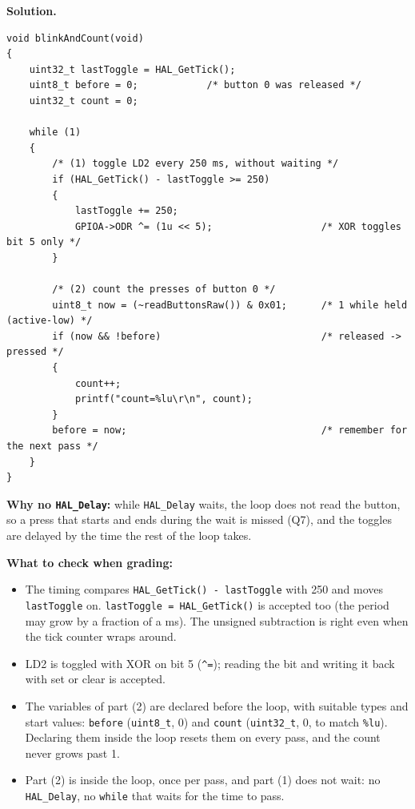 \documentclass[11pt,a4paper]{article}
\newenvironment{solution}{\par\noindent\ignorespaces}{\par}
\begin{document}
\begin{solution}
\medskip\noindent\textbf{Solution.}
\begin{lstlisting}
void blinkAndCount(void)
{
    uint32_t lastToggle = HAL_GetTick();
    uint8_t before = 0;            /* button 0 was released */
    uint32_t count = 0;

    while (1)
    {
        /* (1) toggle LD2 every 250 ms, without waiting */
        if (HAL_GetTick() - lastToggle >= 250)
        {
            lastToggle += 250;
            GPIOA->ODR ^= (1u << 5);                   /* XOR toggles bit 5 only */
        }

        /* (2) count the presses of button 0 */
        uint8_t now = (~readButtonsRaw()) & 0x01;      /* 1 while held (active-low) */
        if (now && !before)                            /* released -> pressed */
        {
            count++;
            printf("count=%lu\r\n", count);
        }
        before = now;                                  /* remember for the next pass */
    }
}
\end{lstlisting}
\textbf{Why no \texttt{HAL\_Delay}:} while \texttt{HAL\_Delay} waits, the loop does not read the button, so a press
that starts and ends during the wait is missed (Q7), and the toggles are delayed by the time the rest of the loop takes.

\medskip\noindent\textbf{What to check when grading:}
\begin{itemize}
  \item The timing compares \texttt{HAL\_GetTick() - lastToggle} with 250 and moves \texttt{lastToggle} on.
        \texttt{lastToggle = HAL\_GetTick()} is accepted too (the period may grow by a fraction of a ms). The unsigned
        subtraction is right even when the tick counter wraps around.
  \item LD2 is toggled with XOR on bit 5 (\texttt{\^{}=}); reading the bit and writing it back with set or clear is
        accepted.
  \item The variables of part (2) are declared before the loop, with suitable types and start values:
        \texttt{before} (\texttt{uint8\_t}, 0) and \texttt{count} (\texttt{uint32\_t}, 0, to match \texttt{\%lu}).
        Declaring them inside the loop resets them on every pass, and the count never grows past 1.
  \item Part (2) is inside the loop, once per pass, and part (1) does not wait: no \texttt{HAL\_Delay}, no
        \texttt{while} that waits for the time to pass.
\end{itemize}
\end{solution}
\end{document}
